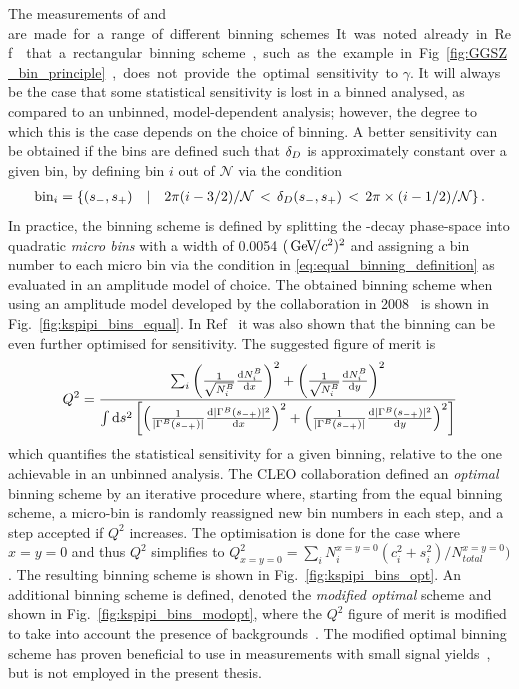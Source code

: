 The measurements of \ci and \si are made for a range of different binning schemes. It was noted already in Ref.~\cite{bondarUseQuantumcorrelatedD02008} that a rectangular binning scheme, such as the example in Fig.~\ref{fig:GGSZ_bin_principle}, does not provide the optimal sensitivity to $\gamma$. It will always be the case that some statistical sensitivity is lost in a binned analysed, as compared to an unbinned, model-dependent analysis; however, the degree to which this is the case depends on the choice of binning. A better sensitivity can be obtained if the bins are defined such that $\delta_{D}$ is approximately constant over a given bin, by defining bin $i$ out of $\mathcal N$ via the condition
\begin{align} \label{eq:equal_binning_definition}
    \text{bin}_i = \left\{ (s_-, s_+)\quad  | \quad 2\pi (i-3/2)/\mathcal N \,<\, \delta_D(s_-, s_+) \,<\, 2\pi \times (i-1/2)/\mathcal N  \right\}.
\end{align}
In practice, the binning scheme is defined by splitting the \D-decay phase-space into quadratic \emph{micro bins} with a width of 0.0054 $(\text{\,Ge\kern -0.1em V\!/}c^2)^2$ and assigning a bin number to each micro bin via the condition in \eqref{eq:equal_binning_definition} as evaluated in an amplitude model of choice. The obtained binning scheme when using an amplitude model developed by the \babar collaboration in 2008~\cite{BABAR2008} is shown in Fig.~\ref{fig:kspipi_bins_equal}. In Ref~\cite{bondarUseQuantumcorrelatedD02008} it was also shown that the binning can be even further optimised for sensitivity. The suggested figure of merit is
\begin{align}
    Q^2 = \frac
    {\sum_i \left(\frac{1}{\sqrt{N_i^{{B}}} }\frac{\text d N_i^{{B}}}{\text d x} \right)^2 + \left(\frac{1}{\sqrt{N_i^{{B}}}} \frac{\text d N_i ^{{B}}}{\text d y} \right)^2}
    {\int \text d s^2 \left[\left(\frac{1}{|\Gamma^{{B}}(s_{-+})|}\frac{ \text d |\Gamma^{{B}}(s_{-+})|^2 }{ \text d x}\right)^2 + \left(\frac{1}{|\Gamma^{{B}}(s_{-+})|}\frac{ \text d |\Gamma^{{B}}(s_{-+})|^2 }{ \text d y}\right)^2 \right]}
\end{align}
which quantifies the statistical sensitivity for a given binning, relative to the one achievable in an unbinned analysis. The CLEO collaboration defined an \emph{optimal} binning scheme by an iterative procedure where, starting from the equal binning scheme, a micro-bin is randomly reassigned new bin numbers in each step, and a step accepted if $Q^2$ increases. The optimisation is done for the case where $x=y=0$ and thus $Q^2$ simplifies to $Q^2_{x=y=0}=\sum_i N_i^{x=y=0}(c_i^2+s_i^2)/N_{total}^{x=y=0})$. The resulting binning scheme is shown in Fig.~\ref{fig:kspipi_bins_opt}. An additional binning scheme is defined, denoted the \emph{modified optimal} scheme and shown in Fig.~\ref{fig:kspipi_bins_modopt}, where the $Q^2$ figure of merit is modified to take into account the presence of backgrounds~\cite{CLEOCISI}. The modified optimal binning scheme has proven beneficial to use in measurements with small signal yields~\cite{LHCb-PAPER-2016-006}, but is not employed in the present thesis. 

